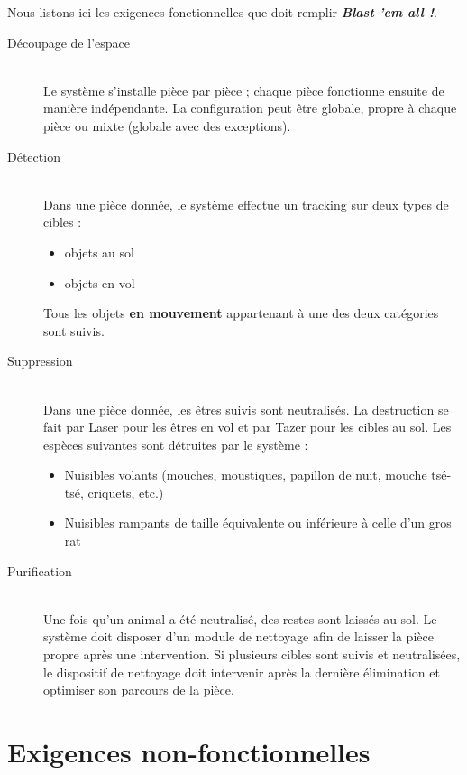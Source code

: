\documentclass[12pt]{article}
\begin{document}
Nous listons ici les exigences fonctionnelles que doit remplir 
\textit{\textbf{Blast 'em all !}}.
\begin{description}
\item[Découpage de l'espace]\hfill\\
Le système s'installe pièce par pièce ; chaque pièce fonctionne ensuite de
manière indépendante. La configuration peut être globale, propre à chaque
pièce ou mixte (globale avec des exceptions).

\item[Détection]\hfill\\
Dans une pièce donnée, le système effectue un tracking sur deux types de
cibles :
    \begin{itemize}
    \item objets au sol
    \item objets en vol
    \end{itemize}
    \vskip 6pt
Tous les objets	\textbf{en mouvement} appartenant à une des deux catégories sont
suivis. 

\item[Suppression]\hfill\\
Dans une pièce donnée, les êtres suivis sont neutralisés. La destruction 
se fait par Laser pour les êtres en vol et par Tazer pour les cibles au
sol. Les espèces suivantes sont détruites par le système :
    \begin{itemize}
    \item Nuisibles volants (mouches, moustiques, papillon de nuit, mouche
    tsé-tsé, criquets, etc.)
    \item Nuisibles rampants de taille équivalente ou inférieure à celle
    d'un gros rat
    \end{itemize}
    \vskip 6pt

\item[Purification]\hfill\\
Une fois qu'un animal a été neutralisé, des restes sont laissés au sol. Le
système doit disposer d'un module de nettoyage afin de laisser la pièce
propre après une intervention. Si plusieurs cibles sont suivis et
neutralisées, le dispositif de nettoyage doit intervenir après la dernière
élimination et optimiser son parcours de la pièce.
\end{description}

\section{Exigences non-fonctionnelles}
\end{document}
